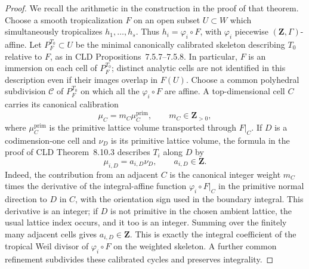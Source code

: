 \begin{proof}
We recall the arithmetic in the construction in the proof of that theorem.
Choose a smooth tropicalization $F$ on an open subset $U\subset W$ which
simultaneously tropicalizes $h_1,\ldots,h_s$.  Thus
$h_i=\varphi_i\circ F$, with $\varphi_i$ piecewise
$(\mathbf Z,\Gamma)$-affine.  Let $P_F^{T_0}\subset U$ be the minimal
canonically calibrated skeleton describing $T_0$ relative to $F$, as in
CLD Propositions~7.5.7--7.5.8.  In particular, $F$ is an immersion on each
cell of $P_F^{T_0}$; distinct analytic cells are not identified in this
description even if their images overlap in $F(U)$.  Choose a common
polyhedral subdivision $\mathscr C$ of $P_F^{T_0}$ on which all the
$\varphi_i\circ F$ are affine.  A top-dimensional cell $C$ carries its
canonical calibration
\[
                         \mu_C=m_C\mu_C^{\mathrm{prim}},
                         \qquad m_C\in\mathbf Z_{>0},
\]
where $\mu_C^{\mathrm{prim}}$ is the primitive lattice volume transported
through $F|_C$.  If $D$ is a codimension-one cell and $\nu_D$ is its
primitive lattice volume, the
formula in the proof of CLD Theorem~8.10.3 describes $T_i$ along $D$ by
\begin{equation}
\label{eq:p06r2-calibration}
                         \mu_{i,D}=a_{i,D}\nu_D,
                         \qquad a_{i,D}\in\mathbf Z.
\end{equation}
Indeed, the contribution from an adjacent $C$ is the canonical integer
weight $m_C$ times the derivative of the integral-affine function
$\varphi_i\circ F|_C$ in the primitive normal direction to $D$ in $C$, with the
orientation sign used in the boundary integral.  This derivative is an
integer; if $D$ is not primitive in the chosen ambient lattice, the usual
lattice index occurs, and it too is an integer.  Summing over the finitely
many adjacent cells gives $a_{i,D}\in\mathbf Z$.  This is exactly the
integral coefficient of the tropical Weil divisor of $\varphi_i\circ F$ on
the weighted skeleton.  A further common refinement subdivides these calibrated
cycles and preserves integrality.


\end{proof}
